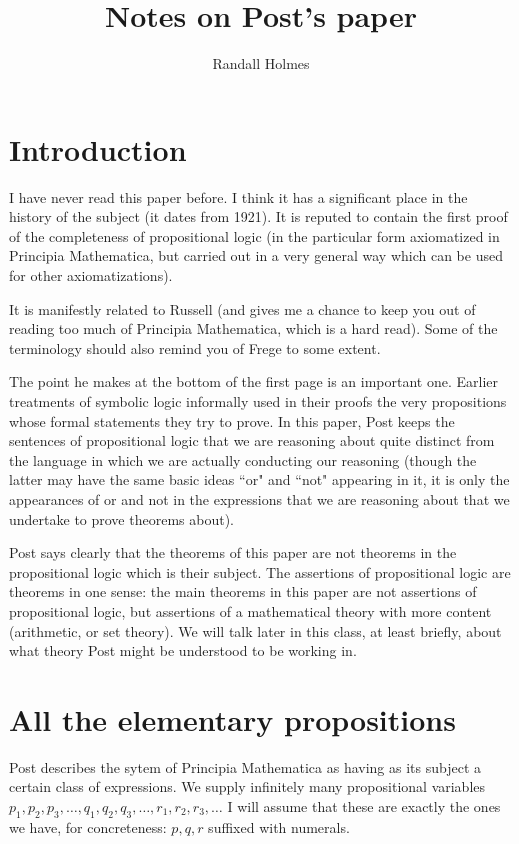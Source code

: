 \documentclass[12pt]{article}
\title{Notes on Post's paper}
\author{Randall Holmes}
\begin{document}
\maketitle

\section{Introduction}

I have never read this paper before.  I think it has a significant place in the history of the subject (it dates from 1921).  It is reputed to contain the first proof of the completeness of propositional logic
(in the particular form axiomatized in Principia Mathematica, but carried out in a very general way which can be used for other axiomatizations).

It is manifestly related to Russell (and gives me a chance to keep you out of reading too much of Principia Mathematica, which is a hard read).  Some of the terminology should also remind you of Frege to some extent.

The point he makes at the bottom of the first page is an important one.  Earlier treatments of symbolic logic informally used in their proofs the very propositions whose formal statements they try to prove.  In this paper, Post keeps the sentences of propositional logic that we are reasoning about quite distinct from the language in which we are actually conducting our reasoning
(though the latter may have the same basic ideas ``or" and ``not" appearing in it, it is only the appearances of or and not in the expressions that we are reasoning about that we undertake to prove theorems about).

Post says clearly that the theorems of this paper are not theorems in the propositional logic which is their subject.  The assertions of propositional logic are theorems in one sense:  the main theorems in this paper are not assertions of propositional logic, but assertions of a mathematical theory with more content (arithmetic, or set theory).  We will talk later in this class, at least briefly, about what theory Post might be understood to be working in.



\section{All the  elementary propositions}

Post describes the sytem of Principia Mathematica as having as its subject a certain class of expressions.  We supply infinitely many propositional variables $p_1,p_2,p_3,\ldots, q_1,q_2,q_3,\ldots, 
r_1,r_2,r_3,\ldots$  I will assume that these are exactly the ones we have, for concreteness:  $p,q,r$ suffixed with numerals.
\end{document}
